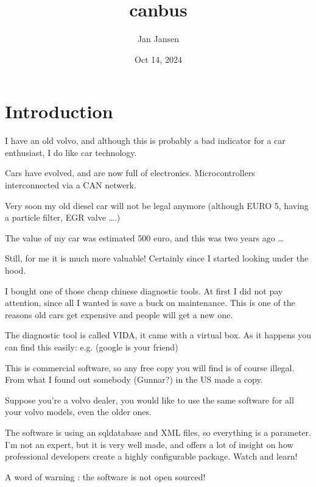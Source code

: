 \documentclass[letterpaper,10pt,english]{sphinxmanual}
\title{canbus}
\date{Oct 14, 2024}
\author{Jan Jansen}
\begin{document}
\pagestyle{empty}
\sphinxmaketitle
\pagestyle{plain}
\sphinxtableofcontents
\pagestyle{normal}
\label{\detokenize{index::doc}}



\chapter{Introduction}
\label{\detokenize{intro:introduction}}\label{\detokenize{intro::doc}}
\sphinxAtStartPar
I have an old volvo, and although this is probably a bad indicator for a car enthusiast, I do like car technology.

\sphinxAtStartPar
Cars have evolved, and are now full of electronics. Microcontrollers interconnected via a CAN netwerk.

\sphinxAtStartPar
Very soon my old diesel car will not be legal anymore (although EURO 5, having a particle filter, EGR valve ….)

\sphinxAtStartPar
The value of my car was estimated 500 euro, and this was two years ago …

\sphinxAtStartPar
Still, for me it is much more valuable! Certainly since I started looking under the hood.

\sphinxAtStartPar
I bought one of those cheap chinese diagnostic tools.
At first I did not pay attention, since all I wanted is save a buck on maintenance. This is one of the reasons old cars get expensive and people will get a new one.

\sphinxAtStartPar
The diagnostic tool is called VIDA, it came with a virtual box.
As it happens you can find this easily: e.g.   (google is your friend)

\sphinxAtStartPar
This is commercial software, so any free copy you will find is of course illegal. From what I found out somebody (Gunnar?) in the US made a copy.

\sphinxAtStartPar
Suppose you’re a volvo dealer, you would like to use the same software for all your volvo models, even the older ones.

\sphinxAtStartPar
The software is using an sql\sphinxhyphen{}database and XML files, so everything is a parameter. I’m not an expert, but it is very well made, and offers a lot of insight on how professional developers create a highly configurable package.
Watch and learn!

\sphinxAtStartPar
A word of warning : the software is not open sourced!
\end{document}

